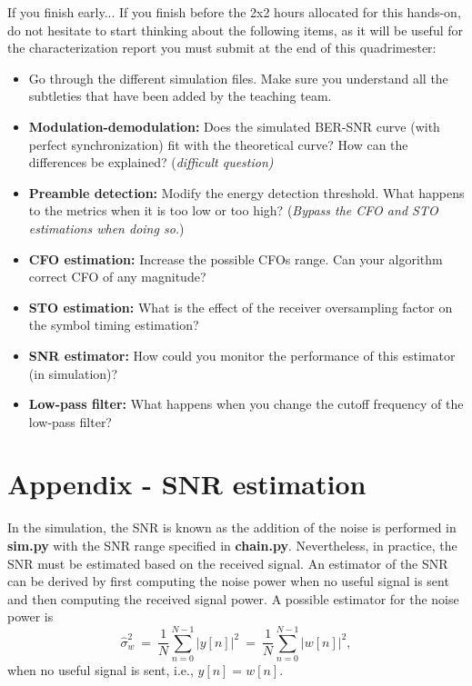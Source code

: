 \begin{bclogo}[couleur = gray!20, arrondi = 0.2, logo=\bcinfo]{If you finish early...}
If you finish before the 2x2 hours allocated for this hands-on, do not hesitate to start thinking about the following items, as it will be useful for the characterization report you must submit at the end of this quadrimester:
\begin{itemize}
    \item Go through the different simulation files. Make sure you understand all the subtleties that have been added by the teaching team.
    \item \textbf{Modulation-demodulation:} Does the simulated BER-SNR curve (with perfect synchronization) fit with the theoretical curve? How can the differences be explained? (\textit{difficult question)}
    \item \textbf{Preamble detection:} Modify the energy detection threshold. What happens to the metrics when it is too low or too high? (\textit{Bypass the CFO and STO estimations when doing so.})
    \item \textbf{CFO estimation:} Increase the possible CFOs range. Can your algorithm correct CFO of any magnitude?
    \item \textbf{STO estimation:} What is the effect of the receiver oversampling factor on the symbol timing estimation?
    \item \textbf{SNR estimator:} How could you monitor the performance of this estimator (in simulation)?
    \item \textbf{Low-pass filter:} What happens when you change the cutoff frequency of the low-pass filter?
\end{itemize}
\end{bclogo}


\pagebreak
\appendix
\section{Appendix - SNR estimation}
\label{appA}
In the simulation, the SNR is known as the addition of the noise is performed in \textbf{sim.py} with the SNR range specified in \textbf{chain.py}. Nevertheless, in practice, the SNR must be estimated based on the received signal. An estimator of the SNR can be derived by first computing the noise power when no useful signal is sent and then computing the received signal power. A possible estimator for the noise power is
\begin{equation*}
    \widehat{\sigma}_{w}^2 \:=\: \frac{1}{N} \sum_{n=0}^{N-1} |y[n]|^2 \:=\: \frac{1}{N} \sum_{n=0}^{N-1} |w[n]|^2,
\end{equation*}
when no useful signal is sent, i.e., $y[n]=w[n]$.

